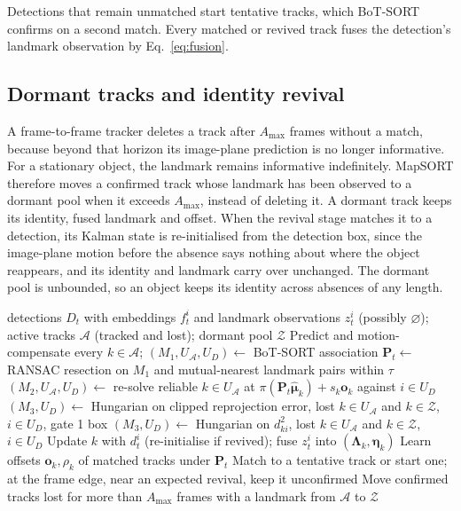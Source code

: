 \documentclass[pdflatex,sn-basic]{sn-jnl}%
\theoremstyle{thmstyleone}%
\newcommand{\bmu}{\bm{\mu}}
\newcommand{\bP}{\bm{P}}
\newcommand{\bo}{\bm{o}}
\newcommand{\bLam}{\bm{\Lambda}}
\newcommand{\bEta}{\bm{\eta}}
\newcommand{\hmu}{\hat{\bmu}}
\begin{document}
Detections that remain unmatched start tentative tracks, which BoT-SORT confirms on a second match. Every matched or revived track fuses the detection's landmark observation by Eq.~\eqref{eq:fusion}.

\subsection{Dormant tracks and identity revival}\label{sec:dormant}

A frame-to-frame tracker deletes a track after $A_{\max}$ frames without a match, because beyond that horizon its image-plane prediction is no longer informative. For a stationary object, the landmark remains informative indefinitely. MapSORT therefore moves a confirmed track whose landmark has been observed to a dormant pool when it exceeds $A_{\max}$, instead of deleting it. A dormant track keeps its identity, fused landmark and offset. When the revival stage matches it to a detection, its Kalman state is re-initialised from the detection box, since the image-plane motion before the absence says nothing about where the object reappears, and its identity and landmark carry over unchanged. The dormant pool is unbounded, so an object keeps its identity across absences of any length.

\begin{algorithm}[t]
\caption{MapSORT update at frame $t$}\label{alg:mapsort}
\begin{algorithmic}[1]
\Require detections $D_t$ with embeddings $f_t^i$ and landmark observations $z_t^i$ (possibly $\varnothing$); active tracks $\mathcal{A}$ (tracked and lost); dormant pool $\mathcal{Z}$
\State Predict and motion-compensate every $k\in\mathcal{A}$; $(M_1,U_\mathcal{A},U_D)\gets$ BoT-SORT association
\State $\bP_t\gets$ RANSAC resection on $M_1$ and mutual-nearest landmark pairs within $\tau$
\If{$\bP_t$ accepted}
  \State $(M_2,U_\mathcal{A},U_D)\gets$ re-solve reliable $k\in U_\mathcal{A}$ at $\pi(\bP_t\hmu_k)+s_k\bo_k$ against $i\in U_D$
  \State $(M_3,U_D)\gets$ Hungarian on clipped reprojection error, lost $k\in U_\mathcal{A}$ and $k\in\mathcal{Z}$, $i\in U_D$, gate 1 box
\Else
  \State $(M_3,U_D)\gets$ Hungarian on $d^2_{ki}$, lost $k\in U_\mathcal{A}$ and $k\in\mathcal{Z}$, $i\in U_D$
\EndIf
{}
  \State Update $k$ with $d_t^i$ (re-initialise if revived); fuse $z_t^i$ into $(\bLam_k,\bEta_k)$
\EndFor
\State Learn offsets $\bo_k,\rho_k$ of matched tracks under $\bP_t$
  \State Match to a tentative track or start one; at the frame edge, near an expected revival, keep it unconfirmed
\EndFor
\State Move confirmed tracks lost for more than $A_{\max}$ frames with a landmark from $\mathcal{A}$ to $\mathcal{Z}$
\end{algorithmic}
\end{algorithm}
\end{document}
